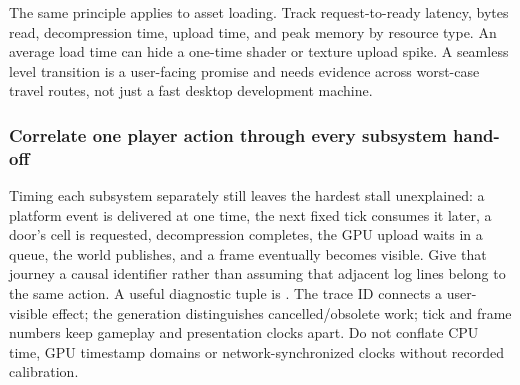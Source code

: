 The same principle applies to asset loading. Track request-to-ready latency, bytes read, decompression time, upload time, and peak memory by resource type. An average load time can hide a one-time shader or texture upload spike. A seamless level transition is a user-facing promise and needs evidence across worst-case travel routes, not just a fast desktop development machine.

\subsubsection{Correlate one player action through every subsystem hand-off}\label{06-engine-ii-ch041-correlate-one-player-action-through-every-subsystem-hand-off}

\hypertarget{06-engine-ii-ch041-correlate-one-player-action-through-every-subsystem-hand-off}{}

Timing each subsystem separately still leaves the hardest stall unexplained: a platform event is delivered at one time, the next fixed tick consumes it later, a door's cell is requested, decompression completes, the GPU upload waits in a queue, the world publishes, and a frame eventually becomes visible. Give that journey a causal identifier rather than assuming that adjacent log lines belong to the same action. A useful diagnostic tuple is . The trace ID connects a user-visible effect; the generation distinguishes cancelled/obsolete work; tick and frame numbers keep gameplay and presentation clocks apart. Do not conflate CPU time, GPU timestamp domains or network-synchronized clocks without recorded calibration.

